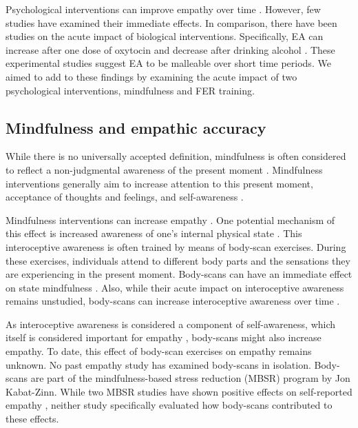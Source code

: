\documentclass[authordate, empirical]{jote-new-article}
\begin{document}
	Psychological interventions can improve empathy over time \parencites{Birnie2010}{Lam2011}{Mascaro2013}. However, few studies have examined their immediate effects. In comparison, there have been studies on the acute impact of biological interventions. Specifically, EA can increase after one dose of oxytocin \parencites{Bartz2010} and decrease after drinking alcohol \parencites{Thiel2018}. These experimental studies suggest EA to be malleable over short time periods. We aimed to add to these findings by examining the acute impact of two psychological interventions, mindfulness and FER training.



	\subsection{Mindfulness and empathic accuracy}



	While there is no universally accepted definition, mindfulness is often considered to reflect a non-judgmental awareness of the present moment \parencites{Bishop2004}. Mindfulness interventions generally aim to increase attention to this present moment, acceptance of thoughts and feelings, and self-awareness \parencites{Sauer-Zavala2013}.



	Mindfulness interventions can increase empathy \parencites{Lam2011}. One potential mechanism of this effect is increased awareness of one's internal physical state \parencites{Birnie2010}{Fischer2017}{Sauer-Zavala2013}{Shapiro1998}. This interoceptive awareness is often trained by means of body-scan exercises. During these exercises, individuals attend to different body parts and the sensations they are experiencing in the present moment. Body-scans can have an immediate effect on state mindfulness \parencites{Upton2019}. Also, while their acute impact on interoceptive awareness remains unstudied, body-scans can increase interoceptive awareness over time \parencites{Fischer2017}.



	As interoceptive awareness is considered a component of self-awareness, which itself is considered important for empathy \parencites{Gallup2002}, body-scans might also increase empathy. To date, this effect of body-scan exercises on empathy remains unknown. No past empathy study has examined body-scans in isolation. Body-scans are part of the mindfulness-based stress reduction (MBSR) program by Jon Kabat-Zinn. While two MBSR studies have shown positive effects on self-reported empathy \parencites{Birnie2010}{Shapiro1998}, neither study specifically evaluated how body-scans contributed to these effects.
\end{document}
